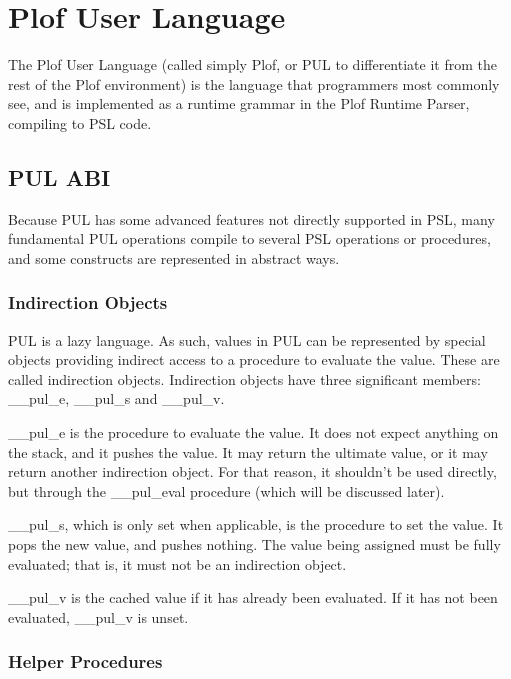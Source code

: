 \chapter{Plof User Language}

The Plof User Language (called simply Plof, or PUL to differentiate it from the rest of the Plof environment) is the language that programmers most commonly see, and is implemented as a runtime grammar in the Plof Runtime Parser, compiling to PSL code.



\section{PUL ABI}

Because PUL has some advanced features not directly supported in PSL, many fundamental PUL operations compile to several PSL operations or procedures, and some constructs are represented in abstract ways.



\subsection{Indirection Objects}

PUL is a lazy language. As such, values in PUL can be represented by special objects providing indirect access to a procedure to evaluate the value. These are called indirection objects. Indirection objects have three significant members: \_\_pul\_e, \_\_pul\_s and \_\_pul\_v.

\_\_pul\_e is the procedure to evaluate the value. It does not expect anything on the stack, and it pushes the value. It may return the ultimate value, or it may return another indirection object. For that reason, it shouldn't be used directly, but through the \_\_pul\_eval procedure (which will be discussed later).

\_\_pul\_s, which is only set when applicable, is the procedure to set the value. It pops the new value, and pushes nothing. The value being assigned must be fully evaluated; that is, it must not be an indirection object.

\_\_pul\_v is the cached value if it has already been evaluated. If it has not been evaluated, \_\_pul\_v is unset.



\subsection{Helper Procedures}

